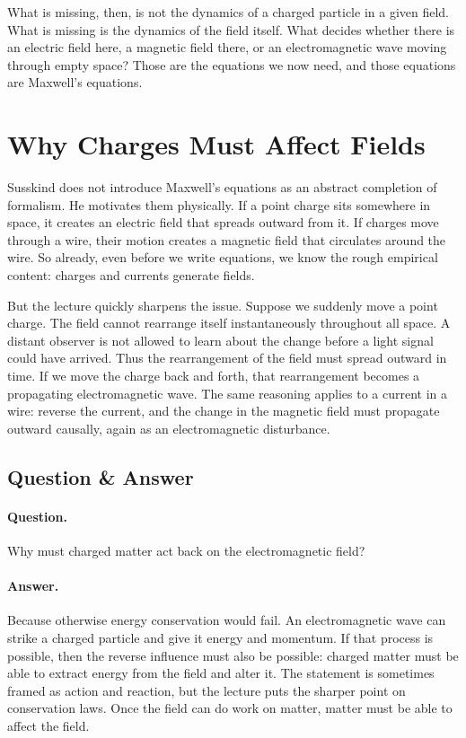 What is missing, then, is not the dynamics of a charged particle in a given field. What is missing is the dynamics of the field itself. What decides whether there is an electric field here, a magnetic field there, or an electromagnetic wave moving through empty space? Those are the equations we now need, and those equations are Maxwell's equations.

\section{Why Charges Must Affect Fields}

Susskind does not introduce Maxwell's equations as an abstract completion of formalism. He motivates them physically. If a point charge sits somewhere in space, it creates an electric field that spreads outward from it. If charges move through a wire, their motion creates a magnetic field that circulates around the wire. So already, even before we write equations, we know the rough empirical content: charges and currents generate fields.

But the lecture quickly sharpens the issue. Suppose we suddenly move a point charge. The field cannot rearrange itself instantaneously throughout all space. A distant observer is not allowed to learn about the change before a light signal could have arrived. Thus the rearrangement of the field must spread outward in time. If we move the charge back and forth, that rearrangement becomes a propagating electromagnetic wave. The same reasoning applies to a current in a wire: reverse the current, and the change in the magnetic field must propagate outward causally, again as an electromagnetic disturbance.

\subsection{Question \& Answer}

\paragraph{Question.} Why must charged matter act back on the electromagnetic field?

\paragraph{Answer.} Because otherwise energy conservation would fail. An electromagnetic wave can strike a charged particle and give it energy and momentum. If that process is possible, then the reverse influence must also be possible: charged matter must be able to extract energy from the field and alter it. The statement is sometimes framed as action and reaction, but the lecture puts the sharper point on conservation laws. Once the field can do work on matter, matter must be able to affect the field.

